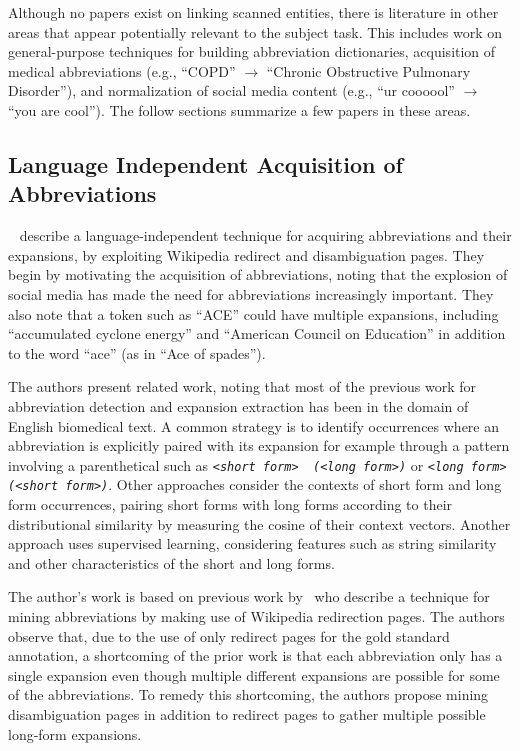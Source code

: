 \documentclass[11pt,a4paper]{article}
\begin{document}
Although no papers exist on linking scanned entities, there is
literature in other areas that appear potentially relevant to the
subject task.  This includes work on general-purpose techniques for
building abbreviation dictionaries, acquisition of medical
abbreviations (e.g., ``COPD'' $\rightarrow$ ``Chronic Obstructive Pulmonary
Disorder''), and normalization of social media content (e.g., ``ur
coooool'' $\rightarrow$ ``you are cool'').  The follow sections
summarize a few papers in these areas.

\subsection{Language Independent Acquisition of Abbreviations}
~\cite{DBLP:journals/corr/abs-1709-08074} describe a
language-independent technique for acquiring abbreviations and their
expansions, by exploiting Wikipedia redirect and disambiguation pages.
They begin by motivating the acquisition of abbreviations, noting that
the explosion of social media has made the need for abbreviations
increasingly important.  They also note that a token such as ``ACE''
could have multiple expansions, including ``accumulated cyclone
energy'' and ``American Council on Education'' in addition to the word
``ace'' (as in ``Ace of spades'').

The authors present related work, noting that most of the previous
work for abbreviation detection and expansion extraction has been in
the domain of English biomedical text.  A common strategy is to
identify occurrences where an abbreviation is explicitly paired with
its expansion for example through a pattern involving a parenthetical
such as {\em \verb|<short form>  (<long form>)|} or {\em
  \verb|<long form> (<short form>)|}.
Other approaches consider the contexts of short form and long form
occurrences, pairing short forms with long forms according to their
distributional similarity by measuring the cosine of their context
vectors.  Another approach uses supervised learning, considering
features such as string similarity and other characteristics of the
short and long forms.

The author's work is based on previous work by~\cite{JACQUET14.468}
who describe a technique for mining abbreviations by making use of
Wikipedia redirection pages.  The authors observe that, due to the use
of only redirect pages for the gold standard annotation, a shortcoming
of the prior work is that each abbreviation only has a single
expansion even though multiple different expansions are possible for
some of the abbreviations.  To remedy this shortcoming, the authors
propose mining disambiguation pages in addition to redirect pages to
gather multiple possible long-form expansions.
\end{document}
